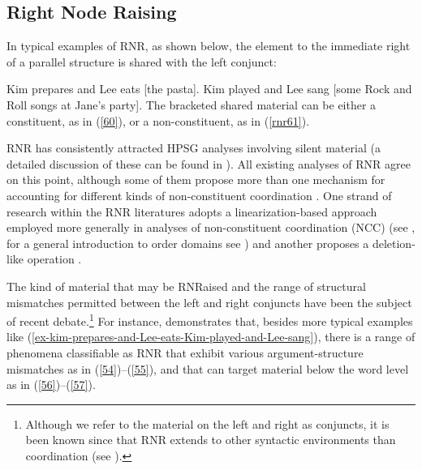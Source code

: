 \subsection{Right Node Raising}

In typical examples of RNR, as shown below, the element to the immediate right of a parallel structure is shared with the left conjunct:

\eal
\label{ex-kim-prepares-and-Lee-eats-Kim-played-and-Lee-sang}
\ex  Kim prepares and Lee eats [the pasta].  \label{60}
\ex  Kim played and Lee sang [some Rock and Roll songs at Jane's party]. \label{rnr61}
\zl
%
The bracketed shared material can be either a constituent, as in (\ref{60}), or a non-constituent, as in (\ref{rnr61}).

RNR has consistently attracted HPSG analyses involving silent material (a detailed discussion of these can be found
in ). 
All existing analyses of RNR \citep{Abeille2016, Beavers2004, Chaves2014, Crysmann2003, Shiraishi2019, Yatabe2001, Yatabe2012} agree on this point,
although some of them propose more than one mechanism for accounting for different kinds of non-constituent coordination \citep{Chaves2014, Yatabe2001, Yatabe2012, Yatabe2019}. One strand of research within the RNR literatures adopts a linearization-based approach employed more generally in analyses of non-constituent coordination (NCC) (see \citealt{Yatabe2001, Yatabe2012}, for a general introduction to order domains see ) and another proposes a deletion-like operation \citep{Abeille2016, Chaves2014, Shiraishi2019}.

%

The kind of material that may be RNRaised and the range of structural mismatches permitted between the left and right conjuncts have been the subject of recent debate.\footnote{Although we refer to the material on the left and right as conjuncts, it is been known since \citet{Hudson1976, Hudson1989} that RNR extends to other syntactic environments than coordination (see \citealt{Chaves2014}).} For instance, \citet[839--840]{Chaves2014} demonstrates that, besides more typical examples like (\ref{ex-kim-prepares-and-Lee-eats-Kim-played-and-Lee-sang}),
 there is a range of phenomena classifiable as RNR that exhibit various argument-structure mismatches as in (\ref{54})--(\ref{55}), and that can target material below the word level as in (\ref{56})--(\ref{57}).
%

